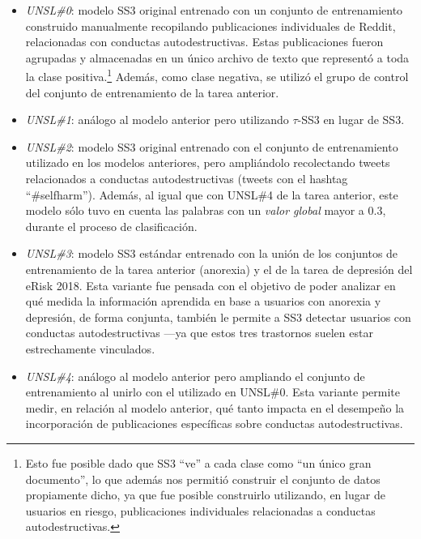 \begin{itemize}
\item \emph{UNSL\#0}: modelo SS3 original entrenado con un conjunto de entrenamiento construido manualmente recopilando publicaciones individuales de Reddit, relacionadas con conductas autodestructivas.
Estas publicaciones fueron agrupadas y almacenadas en un único archivo de texto que representó a toda la clase positiva.\footnote{Esto fue posible dado que SS3 ``ve'' a cada clase como ``un único gran documento'', lo que además nos permitió construir el conjunto de datos propiamente dicho, ya que fue posible construirlo utilizando, en lugar de usuarios en riesgo, publicaciones individuales relacionadas a conductas autodestructivas.}
Además, como clase negativa, se utilizó el grupo de control del conjunto de entrenamiento de la tarea anterior.

\item \emph{UNSL\#1}: análogo al modelo anterior pero utilizando $\tau$-SS3 en lugar de SS3.

\item \emph{UNSL\#2}: modelo SS3 original entrenado con el conjunto de entrenamiento utilizado en los modelos anteriores, pero ampliándolo recolectando tweets relacionados a conductas autodestructivas (tweets con el hashtag ``\#selfharm'').
Además, al igual que con UNSL\#4 de la tarea anterior, este modelo sólo tuvo en cuenta las palabras con un \emph{valor global} mayor a $0.3$, durante el proceso de clasificación.

\item \emph{UNSL\#3}: modelo SS3 estándar entrenado con la unión de los conjuntos de entrenamiento de la tarea anterior (anorexia) y el de la tarea de depresión del eRisk 2018.
Esta variante fue pensada con el objetivo de poder analizar en qué medida la información aprendida en base a usuarios con anorexia y depresión, de forma conjunta, también le permite a SS3 detectar usuarios con conductas autodestructivas ---ya que estos tres trastornos suelen estar estrechamente vinculados.

\item \emph{UNSL\#4}: análogo al modelo anterior pero ampliando el conjunto de entrenamiento al unirlo con el utilizado en UNSL\#0.
Esta variante permite medir, en relación al modelo anterior, qué tanto impacta en el desempeño la incorporación de publicaciones específicas sobre conductas autodestructivas.

\end{itemize}


